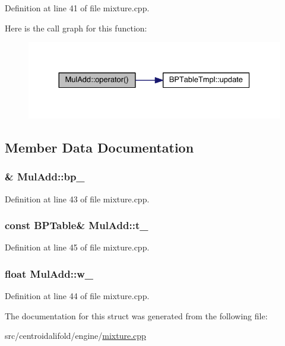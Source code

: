 Definition at line 41 of file mixture.\+cpp.



Here is the call graph for this function\+:
\nopagebreak
\begin{figure}[H]
\begin{center}
\leavevmode
\includegraphics[width=330pt]{struct_mul_add_a200f76dbb10df766e99a5ee9e8485e02_cgraph}
\end{center}
\end{figure}




\subsection{Member Data Documentation}
\hypertarget{struct_mul_add_a79aba94efccf5784e5f2a7481c4e7877}{
\subsubsection[{bp\+\_\+}]{\& Mul\+Add\+::bp\+\_\+}}\label{struct_mul_add_a79aba94efccf5784e5f2a7481c4e7877}


Definition at line 43 of file mixture.\+cpp.

\hypertarget{struct_mul_add_a3dc017d7e72df73b290feedbd90b6696}{
\subsubsection[{t\+\_\+}]{\setlength{\rightskip}{0pt plus 5cm}const {\bf B\+P\+Table}\& Mul\+Add\+::t\+\_\+}}\label{struct_mul_add_a3dc017d7e72df73b290feedbd90b6696}


Definition at line 45 of file mixture.\+cpp.

\hypertarget{struct_mul_add_a276a4503f05e81c57f9e668d792a9b90}{
\subsubsection[{w\+\_\+}]{\setlength{\rightskip}{0pt plus 5cm}float Mul\+Add\+::w\+\_\+}}\label{struct_mul_add_a276a4503f05e81c57f9e668d792a9b90}


Definition at line 44 of file mixture.\+cpp.



The documentation for this struct was generated from the following file\+:\begin{DoxyCompactItemize}
\item 
src/centroidalifold/engine/\hyperlink{mixture_8cpp}{mixture.\+cpp}\end{DoxyCompactItemize}
